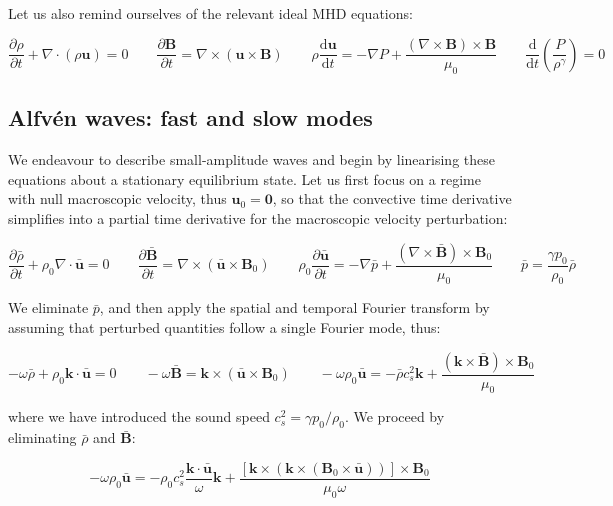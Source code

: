 Let us also remind ourselves of the relevant ideal MHD equations:

\begin{equation}
    \frac{\partial\rho}{\partial t}+\nabla\cdot(\rho\mathbf{u})=0\qquad\frac{\partial\mathbf{B}}{\partial t}=\nabla\times(\mathbf{u}\times\mathbf{B})\qquad\rho\frac{\mathrm{d}\mathbf{u}}{\mathrm{d}t}=-\nabla P+\frac{(\nabla\times\mathbf{B})\times\mathbf{B}}{\mu_0}\qquad\frac{\mathrm{d}}{\mathrm{d}t}\left(\frac{P}{\rho^\gamma}\right)=0
\end{equation}

\subsection{Alfvén waves: fast and slow modes}

We endeavour to describe small-amplitude waves and begin by linearising these equations about a stationary equilibrium state. Let us first focus on a regime with null macroscopic velocity, thus $\mathbf{u}_0=\mathbf{0}$, so that the convective time derivative simplifies into a partial time derivative for the macroscopic velocity perturbation:

\begin{equation}
    \frac{\partial\bar{\rho}}{\partial t}+\rho_0\nabla\cdot\bar{\mathbf{u}}=0\qquad\frac{\partial\bar{\mathbf{B}}}{\partial t}=\nabla\times(\bar{\mathbf{u}}\times\mathbf{B}_0)\qquad\rho_0\frac{\partial\bar{\mathbf{u}}}{\partial t}=-\nabla\bar{p}+\frac{(\nabla\times\bar{\mathbf{B}})\times\mathbf{B}_0}{\mu_0}\qquad\bar{p}=\frac{\gamma p_0}{\rho_0}\bar{\rho}
\end{equation}

We eliminate $\bar{p}$, and then apply the spatial and temporal Fourier transform by assuming that perturbed quantities follow a single Fourier mode, thus:

\begin{equation}
    -\omega\bar{\rho}+\rho_0\mathbf{k}\cdot\bar{\mathbf{u}}=0\qquad-\omega\bar{\mathbf{B}}=\mathbf{k}\times(\bar{\mathbf{u}}\times\mathbf{B}_0)\qquad-\omega\rho_0\bar{\mathbf{u}}=-\bar{\rho}c_s^2\mathbf{k}+\frac{(\mathbf{k}\times\bar{\mathbf{B}})\times\mathbf{B}_0}{\mu_0}
\end{equation}

where we have introduced the sound speed $c_s^2=\gamma p_0/\rho_0$. We proceed by eliminating $\bar{\rho}$ and $\bar{\mathbf{B}}$:

\begin{equation}
    -\omega\rho_0\bar{\mathbf{u}}=-\rho_0 c_s^2\frac{\mathbf{k}\cdot\bar{\mathbf{u}}}{\omega}\mathbf{k}+\frac{[\mathbf{k}\times(\mathbf{k}\times(\mathbf{B}_0\times\bar{\mathbf{u}}))]\times\mathbf{B}_0}{\mu_0\omega}
\end{equation}


